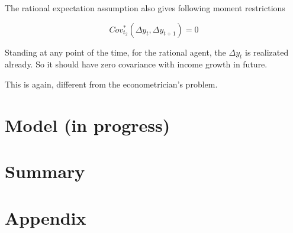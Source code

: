 \documentclass[12pt,notitlepage,onecolumn,aps,pra]{article}
\begin{document}
The rational expectation assumption also gives following moment
restrictions

\begin{equation}
Cov^*_{t_2}(\Delta y_t, \Delta y_{t+1}) = 0
\end{equation}

Standing at any point of the time, for the rational agent, the
\(\Delta y_t\) is realizated already. So it should have zero covariance
with income growth in future.

This is again, different from the econometrician's problem.

    \hypertarget{model-in-progress}{%
\section{Model (in progress)}\label{model-in-progress}}

    \hypertarget{summary}{%
\section{Summary}\label{summary}}

    \hypertarget{appendix}{%
\section{Appendix}\label{appendix}}
\end{document}
